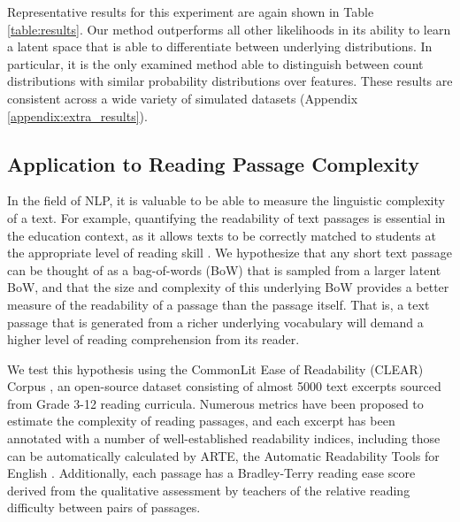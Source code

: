 \documentclass{article}
\theoremstyle{plain}
\theoremstyle{definition}
\theoremstyle{remark}
\begin{document}
Representative results for this experiment are again shown in Table \ref{table:results}. Our method outperforms all other likelihoods in its ability to learn a latent space that is able to differentiate between underlying distributions. In particular, it is the only examined method able to distinguish between count distributions with similar probability distributions over features. These results are consistent across a wide variety of simulated datasets (Appendix \ref{appendix:extra_results}).

\subsection{Application to Reading Passage Complexity}
\label{sec:complexity}

In the field of NLP, it is valuable to be able to measure the linguistic complexity of a text. For example, quantifying the readability of text passages is essential in the education context, as it allows texts to be correctly matched to students at the appropriate level of reading skill \cite{sarti2021looks}. We hypothesize that any short text passage can be thought of as a bag-of-words (BoW) that is sampled from a larger latent BoW, and that the size and complexity of this underlying BoW provides a better measure of the readability of a passage than the passage itself. That is, a text passage that is generated from a richer underlying vocabulary will demand a higher level of reading comprehension from its reader.

We test this hypothesis using the CommonLit Ease of Readability (CLEAR) Corpus \citep{crossley2023large}, an open-source dataset consisting of almost 5000 text excerpts sourced from Grade 3-12 reading curricula. Numerous metrics have been proposed to estimate the complexity of reading passages, and each excerpt has been annotated with a number of well-established readability indices, including those can be automatically calculated by ARTE, the Automatic Readability Tools for English \citep{choi2022advances}. Additionally, each passage has a Bradley-Terry reading ease score \cite{bradley1952rank} derived from the qualitative assessment by teachers of the relative reading difficulty between pairs of passages.
\end{document}
